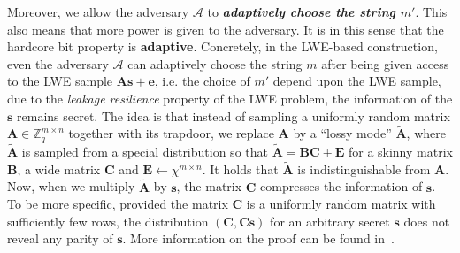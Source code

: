 Moreover, we allow the adversary $\mathcal{A}$ to \textbf{\textit{adaptively choose the string $m'$}}. This also means that more power is given to the adversary. It is in this sense that the hardcore bit property is \textbf{adaptive}. Concretely, in the LWE-based construction, even the adversary $\mathcal{A}$ can adaptively choose the string $m$ after being given access to the LWE sample $\mathbf{A}\mathbf{s}+\mathbf{e}$, i.e. the choice of $m'$ depend upon the LWE sample, due to the \textit{leakage resilience} property of the LWE problem, the information of the $\mathbf{s}$ remains secret. The idea is that instead of sampling a uniformly random matrix $\mathbf{A}\in\mathbb{Z}^{m\times n}_q$ together with its trapdoor, we replace $\mathbf{A}$ by a ``lossy mode'' $\tilde{\mathbf{A}}$, where $\tilde{\mathbf{A}}$ is sampled from a special distribution so that $\tilde{\mathbf{A}}=\mathbf{B}\mathbf{C}+\mathbf{E}$ for a skinny matrix $\mathbf{B}$, a wide matrix $\mathbf{C}$ and $\mathbf{E}\gets\chi^{m\times n}$. It holds that $\tilde{\mathbf{A}}$ is indistinguishable from $\mathbf{A}$. Now, when we multiply $\tilde{\mathbf{A}}$ by $\mathbf{s}$, the matrix $\mathbf{C}$ compresses the information of $\mathbf{s}$. To be more specific, provided the matrix $\mathbf{C}$ is a uniformly random matrix with sufficiently few rows, the distribution $(\mathbf{C},\mathbf{C}\mathbf{s})$ for an arbitrary secret $\mathbf{s}$ does not reveal any parity of $\mathbf{s}$. More information on the proof can be found in~\cite{Brakerski18_Interactiveproofofquantumness}.